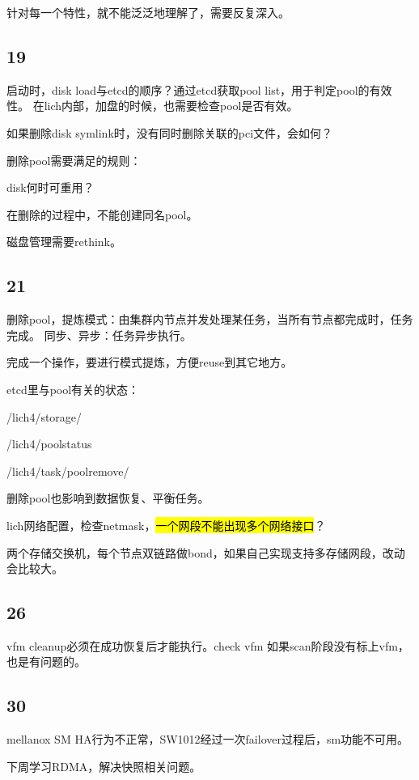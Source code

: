 针对每一个特性，就不能泛泛地理解了，需要反复深入。

\subsection{19}

启动时，disk load与etcd的顺序？通过etcd获取pool list，用于判定pool的有效性。
在lich内部，加盘的时候，也需要检查pool是否有效。

如果删除disk symlink时，没有同时删除关联的pci文件，会如何？

删除pool需要满足的规则：
\begin{enumbox}
\item disk何时可重用？
\item 在删除的过程中，不能创建同名pool。
\end{enumbox}

磁盘管理需要rethink。

\subsection{21}

删除pool，提炼模式：由集群内节点并发处理某任务，当所有节点都完成时，任务完成。
同步、异步：任务异步执行。

完成一个操作，要进行模式提炼，方便reuse到其它地方。

etcd里与pool有关的状态：
\begin{enumbox}
\item /lich4/storage/
\item /lich4/poolstatus
\item /lich4/task/poolremove/
\end{enumbox}

删除pool也影响到数据恢复、平衡任务。

lich网络配置，检查netmask，\hl{一个网段不能出现多个网络接口}？

两个存储交换机，每个节点双链路做bond，如果自己实现支持多存储网段，改动会比较大。

\subsection{26}

vfm cleanup必须在成功恢复后才能执行。check vfm
如果scan阶段没有标上vfm，也是有问题的。

\subsection{30}

mellanox SM HA行为不正常，SW1012经过一次failover过程后，sm功能不可用。

下周学习RDMA，解决快照相关问题。
